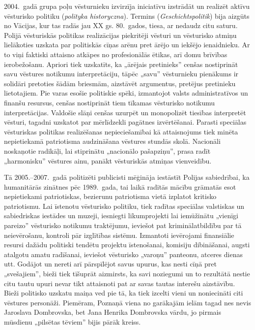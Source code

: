 \documentclass[twoside,a5paper,12pt,fleqn,openany]{extbook}
\newcommand{\pltxti}[1]{\textit{\textpolish{#1}}}
\newcommand{\detxti}[1]{\textit{\textgerman{#1}}}
\begin{document}
2004.~gadā grupa poļu vēsturnieku izvirzīja iniciatīvu izstrādāt un realizēt aktīvu vēsturisko politiku (\pltxti{polityka historyczna}). Termins (\detxti{Geschichtspolitik}) bija aizgūts no Vācijas, kur tas radās jau XX gs. 80.~gados, tiesa, ar nedaudz citu saturu. Polijā vēsturiskās politikas realizācijas piekritēji vēsturi un vēsturisko atmiņu lielākoties uzskata par politiskās cīņas arēnu pret ārējo un iekšējo ienaidnieku. Ar to viņi faktiski attaisno atkāpes no profesionālās ētikas, arī domu brīvības ierobežošanu. Apriori tiek uzskatīts, ka „ārējais pretinieks” cenšas nostiprināt savu vēstures notikumu interpretāciju, tāpēc „savu” vēsturnieku pienākums ir solidāri pretoties šādām briesmām, aizstāvēt argumentus, pretējus pretinieku lietotajiem. Pie varas esošie politiskie spēki, izmantojot valsts administratīvos un finanšu resursus, cenšas nostiprināt tiem tīkamas vēsturisko notikumu interpretācijas. Valdošie slāņi cenšas uzurpēt un monopolizēt tiesības interpretēt vēsturi, tagadni uzskatot par mērlīdzekli pagātnes izvērtēšanai. Parasti speciālas vēsturiskas politikas realizēšanas nepieciešamībai kā attaisnojums tiek minēta nepietiekamā patriotisma audzināšana vēstures stundās skolā. Nacionāli noskaņotie radikāļi, lai stiprinātu „nacionālo pašapziņu”, prasa radīt „harmonisku” vēstures ainu, panākt vēsturiskās atmiņas vienveidību.

Tā 2005.--2007.~gadā politizēti publicisti mēģināja iestāstīt Polijas sabiedrībai, ka humanitārās zinātnes pēc 1989.~gada, tai laikā radītās mācību grāmatās esot nepietiekami patriotiskas, bezierunu patriotisma vietā izplatot kritisko patriotismu. Lai īstenotu vēsturisko politiku, tiek radītas speciālas valstiskas un sabiedriskas iestādes un muzeji, iesniegti likumprojekti lai iemūžinātu „vienīgi pareizo” vēsturisko notikumu traktējumu, ieviešot pat kriminālatbildību par tā neievērošanu, kontroli pār izglītības sistēmu. Izmantoti ievērojami finansiālie resursi dažādu politiski tendētu projektu īstenošanai, komisiju dibināšanai, augsti atalgotu amatu radīšanai, ieviešot vēsturisko „varoņu” panteonu, atceres dienas utt. Godājot un nereti arī pārspīlējot savus upurus, kas nesti cīņā pret „svešajiem”, bieži tiek tīšuprāt aizmirsts, ka savi noziegumi un to rezultātā nestie citu tautu upuri nevar tikt attaisnoti pat ar savas tautas interešu aizstāvību. Bieži politisko uzskatu maiņa ved pie tā, ka tiek izcelti vieni un noniecināti citi vēstures personāži. Piemēram, Poznaņā viena no garākajām ielām tagad nes nevis Jaroslava Dombrovska, bet Jana Henrika Dombrovska vārdu, jo pirmais mūsdienu „pilsētas tēviem” bijis pārāk kreiss.
\end{document}
